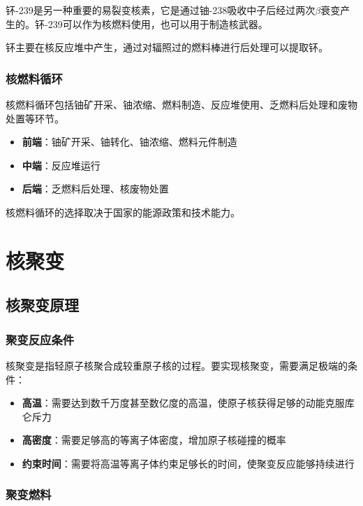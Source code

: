 \documentclass[12pt,UTF8]{ctexbook}
\begin{document}
钚-239是另一种重要的易裂变核素，它是通过铀-238吸收中子后经过两次$\beta$衰变产生的。钚-239可以作为核燃料使用，也可以用于制造核武器。

钚主要在核反应堆中产生，通过对辐照过的燃料棒进行后处理可以提取钚。

\section{核燃料循环}

核燃料循环包括铀矿开采、铀浓缩、燃料制造、反应堆使用、乏燃料后处理和废物处置等环节。

\begin{itemize}[leftmargin=2cm]
    \item \textbf{前端}：铀矿开采、铀转化、铀浓缩、燃料元件制造
    \item \textbf{中端}：反应堆运行
    \item \textbf{后端}：乏燃料后处理、核废物处置
\end{itemize}

核燃料循环的选择取决于国家的能源政策和技术能力。

\part{核聚变}

\chapter{核聚变原理}

\section{聚变反应条件}

核聚变是指轻原子核聚合成较重原子核的过程。要实现核聚变，需要满足极端的条件：

\begin{itemize}[leftmargin=2cm]
    \item \textbf{高温}：需要达到数千万度甚至数亿度的高温，使原子核获得足够的动能克服库仑斥力
    \item \textbf{高密度}：需要足够高的等离子体密度，增加原子核碰撞的概率
    \item \textbf{约束时间}：需要将高温等离子体约束足够长的时间，使聚变反应能够持续进行
\end{itemize}

\section{聚变燃料}
\end{document}
